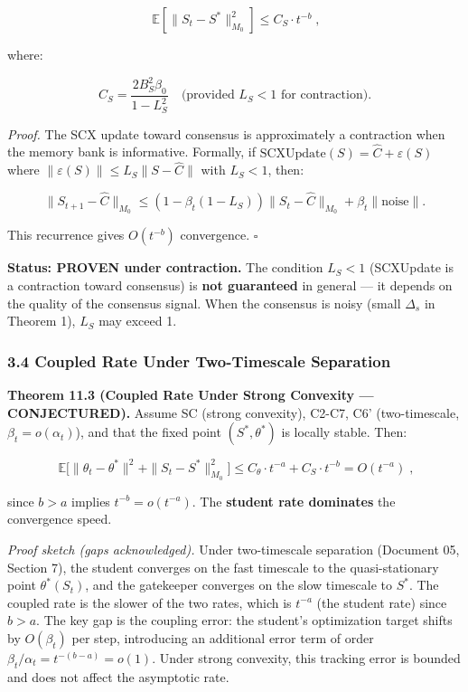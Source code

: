 \documentclass[
  12pt,
]{ctexart}
\begin{document}
\[\boxed{\;\mathbb{E}[\|S_t - S^*\|_{M_0}^2] \leq C_S \cdot t^{-b}\;},\]

where:

\[C_S = \frac{2 B_S^2 \beta_0}{1 - L_S^2} \quad \text{(provided } L_S < 1 \text{ for contraction)}.\]

\emph{Proof.} The SCX update toward consensus is approximately a
contraction when the memory bank is informative. Formally, if
\(\text{SCXUpdate}(S) = \hat{C} + \varepsilon(S)\) where
\(\|\varepsilon(S)\| \leq L_S \|S - \hat{C}\|\) with \(L_S < 1\), then:

\[\|S_{t+1} - \hat{C}\|_{M_0} \leq (1 - \beta_t(1 - L_S)) \|S_t - \hat{C}\|_{M_0} + \beta_t \|\text{noise}\|.\]

This recurrence gives \(O(t^{-b})\) convergence. \(\square\)

\textbf{Status: PROVEN under contraction.} The condition \(L_S < 1\)
(SCXUpdate is a contraction toward consensus) is \textbf{not guaranteed}
in general --- it depends on the quality of the consensus signal. When
the consensus is noisy (small \(\Delta_s\) in Theorem 1), \(L_S\) may
exceed 1.

\subsubsection{3.4 Coupled Rate Under Two-Timescale
Separation}\label{coupled-rate-under-two-timescale-separation}

\textbf{Theorem 11.3 (Coupled Rate Under Strong Convexity ---
CONJECTURED).} Assume SC (strong convexity), C2-C7, C6' (two-timescale,
\(\beta_t = o(\alpha_t)\)), and that the fixed point \((S^*, \theta^*)\)
is locally stable. Then:

\[\boxed{\;\mathbb{E}\bigl[\|\theta_t - \theta^*\|^2 + \|S_t - S^*\|_{M_0}^2\bigr] \leq C_\theta \cdot t^{-a} + C_S \cdot t^{-b} = O(t^{-a})\;},\]

since \(b > a\) implies \(t^{-b} = o(t^{-a})\). The \textbf{student rate
dominates} the convergence speed.

\emph{Proof sketch (gaps acknowledged).} Under two-timescale separation
(Document 05, Section 7), the student converges on the fast timescale to
the quasi-stationary point \(\theta^*(S_t)\), and the gatekeeper
converges on the slow timescale to \(S^*\). The coupled rate is the
slower of the two rates, which is \(t^{-a}\) (the student rate) since
\(b > a\). The key gap is the coupling error: the student's optimization
target shifts by \(O(\beta_t)\) per step, introducing an additional
error term of order \(\beta_t / \alpha_t = t^{-(b-a)} = o(1)\). Under
strong convexity, this tracking error is bounded and does not affect the
asymptotic rate.
\end{document}
